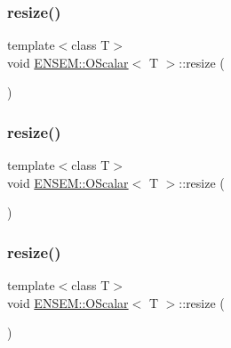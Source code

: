\subsubsection{\texorpdfstring{resize()}{resize()}\hspace{0.1cm}{\footnotesize\ttfamily [1/6]}}
{\footnotesize\ttfamily template$<$class T$>$ \\
void \mbox{\hyperlink{classENSEM_1_1OScalar}{E\+N\+S\+E\+M\+::\+O\+Scalar}}$<$ T $>$\+::resize (\begin{DoxyParamCaption}\item[{const \mbox{\hyperlink{classENSEM_1_1OScalar}{O\+Scalar}}$<$ T $>$ \&}]{ }\end{DoxyParamCaption})\hspace{0.3cm}{\ttfamily [inline]}}

\mbox{\label{classENSEM_1_1OScalar_ab7d5b96a7f1a3451bedd04eda3169c84}} 
\subsubsection{\texorpdfstring{resize()}{resize()}\hspace{0.1cm}{\footnotesize\ttfamily [2/6]}}
{\footnotesize\ttfamily template$<$class T$>$ \\
void \mbox{\hyperlink{classENSEM_1_1OScalar}{E\+N\+S\+E\+M\+::\+O\+Scalar}}$<$ T $>$\+::resize (\begin{DoxyParamCaption}\item[{const \mbox{\hyperlink{classENSEM_1_1OScalar}{O\+Scalar}}$<$ T $>$ \&}]{ }\end{DoxyParamCaption})\hspace{0.3cm}{\ttfamily [inline]}}

\mbox{\label{classENSEM_1_1OScalar_ab7d5b96a7f1a3451bedd04eda3169c84}} 
\subsubsection{\texorpdfstring{resize()}{resize()}\hspace{0.1cm}{\footnotesize\ttfamily [3/6]}}
{\footnotesize\ttfamily template$<$class T$>$ \\
void \mbox{\hyperlink{classENSEM_1_1OScalar}{E\+N\+S\+E\+M\+::\+O\+Scalar}}$<$ T $>$\+::resize (\begin{DoxyParamCaption}\item[{const \mbox{\hyperlink{classENSEM_1_1OScalar}{O\+Scalar}}$<$ T $>$ \&}]{ }\end{DoxyParamCaption})\hspace{0.3cm}{\ttfamily [inline]}}

